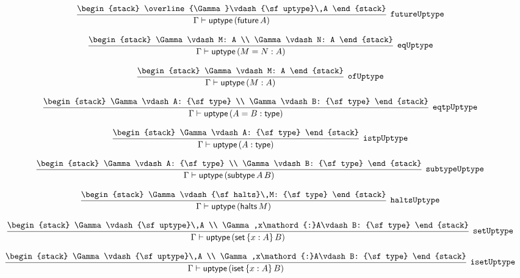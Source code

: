 \[
\infer[{\tt futureUptype}]{\Gamma \vdash {\sf uptype}\,({\sf future}\,A)}{
\begin{stack}
\overline{\Gamma}\vdash {\sf uptype}\,A
\end{stack}}
\]

\[
\infer[{\tt eqUptype}]{\Gamma \vdash {\sf uptype}\,(M= N: A)}{
\begin{stack}
\Gamma \vdash M: A
\\
\Gamma \vdash N: A
\end{stack}}
\]

\[
\infer[{\tt ofUptype}]{\Gamma \vdash {\sf uptype}\,(M: A)}{
\begin{stack}
\Gamma \vdash M: A
\end{stack}}
\]

\[
\infer[{\tt eqtpUptype}]{\Gamma \vdash {\sf uptype}\,(A= B: {\sf type})}{
\begin{stack}
\Gamma \vdash A: {\sf type}
\\
\Gamma \vdash B: {\sf type}
\end{stack}}
\]

\[
\infer[{\tt istpUptype}]{\Gamma \vdash {\sf uptype}\,(A: {\sf type})}{
\begin{stack}
\Gamma \vdash A: {\sf type}
\end{stack}}
\]

\[
\infer[{\tt subtypeUptype}]{\Gamma \vdash {\sf uptype}\,({\sf subtype}\,A\,B)}{
\begin{stack}
\Gamma \vdash A: {\sf type}
\\
\Gamma \vdash B: {\sf type}
\end{stack}}
\]

\[
\infer[{\tt haltsUptype}]{\Gamma \vdash {\sf uptype}\,({\sf halts}\,M)}{
\begin{stack}
\Gamma \vdash {\sf halts}\,M: {\sf type}
\end{stack}}
\]

\[
\infer[{\tt setUptype}]{\Gamma \vdash {\sf uptype}\,({\sf set}\,\{x : A\}\,B)}{
\begin{stack}
\Gamma \vdash {\sf uptype}\,A
\\
\Gamma ,x\mathord{:}A\vdash B: {\sf type}
\end{stack}}
\]

\[
\infer[{\tt isetUptype}]{\Gamma \vdash {\sf uptype}\,({\sf iset}\,\{x : A\}\,B)}{
\begin{stack}
\Gamma \vdash {\sf uptype}\,A
\\
\Gamma ,x\mathord{:}A\vdash B: {\sf type}
\end{stack}}
\]

